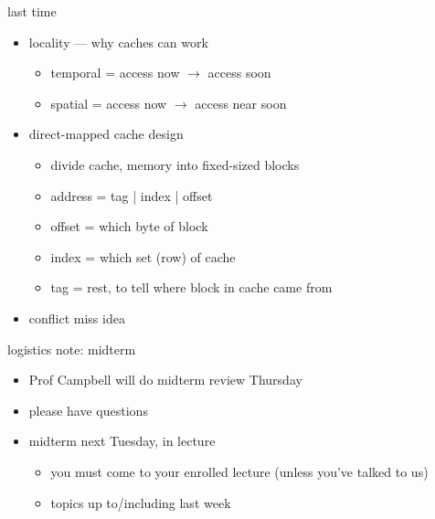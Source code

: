 \date{}
\title{}
\date{}

\begin{frame}
    \titlepage
\end{frame}





\begin{frame}{last time}
    \begin{itemize}
    \item locality --- why caches can work
        \begin{itemize}
        \item temporal = access now $\rightarrow$ access soon
        \item spatial = access now $\rightarrow$ access near soon
        \end{itemize}
    \item direct-mapped cache design
        \begin{itemize}
        \item divide cache, memory into fixed-sized blocks
        \item address = tag | index | offset
        \item offset = which byte of block
        \item index = which set (row) of cache
        \item tag = rest, to tell where block in cache came from
        \end{itemize}
    \item conflict miss idea
    \end{itemize}
\end{frame}

\begin{frame}{logistics note: midterm}
    \begin{itemize}
    \item Prof Campbell will do midterm review Thursday 
    \item please have questions
    \vspace{.5cm}
    \item midterm next Tuesday, in lecture
        \begin{itemize}
        \item you must come to your enrolled lecture (unless you've talked to us)
        \item topics up to/including last week
        \end{itemize}
    \end{itemize}
\end{frame}

